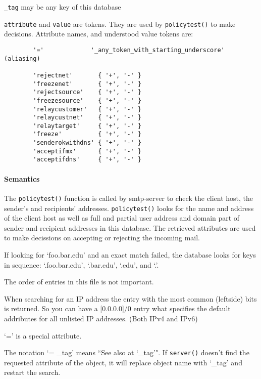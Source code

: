 {\tt \_tag} may be any key of this database

{\tt attribute} and {\tt value} are tokens. They are used by 
{\tt policytest()} to make decisions.  Attribute names, and understood 
value tokens are:

\begin{tscreen}
\begin{verbatim}
        '='             '_any_token_with_starting_underscore' (aliasing)

        'rejectnet'       { '+', '-' }
        'freezenet'       { '+', '-' }
        'rejectsource'    { '+', '-' }
        'freezesource'    { '+', '-' }
        'relaycustomer'   { '+', '-' }
        'relaycustnet'    { '+', '-' }
        'relaytarget'     { '+', '-' }
        'freeze'          { '+', '-' }
        'senderokwithdns' { '+', '-' }
        'acceptifmx'      { '+', '-' }
        'acceptifdns'     { '+', '-' }
\end{verbatim}
\end{tscreen}





\paragraph{Semantics}



The {\tt policytest()} function is called by smtp-server to check the client 
host, the sender's and recipients' addresses.  {\tt policytest()} looks for 
the name and address of the client host as well as full and partial user address 
and domain part of sender and recipient addresses in this database.  The 
retrieved attributes are used to make decissions on accepting or rejecting 
the incoming mail.

If looking for `foo.bar.edu' and an exact match failed, the database looks for 
keys in sequence:  `.foo.bar.edu', `.bar.edu', `.edu', and `.'.

The order of entries in this file is not important.

When searching for an IP address the entry with the most common (leftside) bits
is returned. So you can have a [0.0.0.0]/0 entry what specifies the 
default addributes for all unlisted IP addresses. (Both IPv4 and IPv6)

`=' is a special attribute.

The notation `= \_tag' means ``See also at `\_tag'". If {\tt server()} doesn't 
find the requested attribute of the object, it will replace object name 
with `\_tag' and restart the search.

